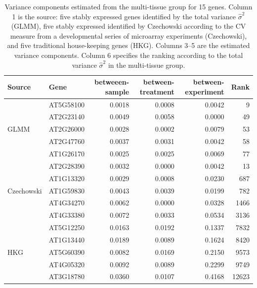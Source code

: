 \documentclass[letterpaper,12pt]{article}
\begin{document}
\begin{table}[]
	\centering
	\caption{Variance components estimated from the multi-tissue group for 15 genes. Column 1 is the source: five stably expressed genes identified by the total variance $\hat{\sigma}^2$ (GLMM), five stably expressed identified by Czechowski according to the CV measure from a developmental series of microarray experiments (Czechowski), and  five traditional house-keeping genes (HKG). Columns 3--5 are the estimated variance components. Column 6 specifies the ranking according to the total variance $\hat{\sigma}^2$ in the multi-tissue group.}
	\label{table:15genes}
	{\footnotesize\begin{tabular}{llrrrr}\\ \hline
		Source                        & Gene      & betweeen-sample & between-treatment & between-experiment & Rank  \\  \hline
		\multirow{5}{*}{GLMM}    & AT5G58100 & 0.0018          & 0.0008            & 0.0042             & 9     \\
		& AT2G23140 & 0.0049          & 0.0058            & 0.0000             & 49    \\
		& AT2G26000 & 0.0028          & 0.0002            & 0.0079             & 53    \\
		& AT2G47760 & 0.0037          & 0.0031            & 0.0042             & 58    \\
		& AT1G26170 & 0.0025          & 0.0025            & 0.0069             & 77    \\  \hline
		\multirow{5}{*}{Czechowski} & AT2G28390 & 0.0032          & 0.0000            & 0.0042             & 13    \\
		& AT1G13320 & 0.0029          & 0.0008            & 0.0230             & 687   \\
		& AT1G59830 & 0.0043          & 0.0039            & 0.0199             & 782   \\
		& AT4G34270 & 0.0062          & 0.0000            & 0.0328             & 1466  \\
		& AT4G33380 & 0.0072          & 0.0033            & 0.0534             & 3136  \\   \hline
	 \multirow{5}{*}{HKG}              & AT5G12250 & 0.0163          & 0.0192            & 0.1337             & 7832  \\   
		& AT1G13440 & 0.0189          & 0.0089            & 0.1624             & 8420  \\
		& AT5G60390 & 0.0082          & 0.0169            & 0.2150             & 9573  \\
		& AT4G05320 & 0.0092          & 0.0089            & 0.2299             & 9749  \\
		& AT3G18780 & 0.0360          & 0.0107            & 0.4168             & 12623  \\   \hline
	\end{tabular}}
\end{table}
\end{document}
